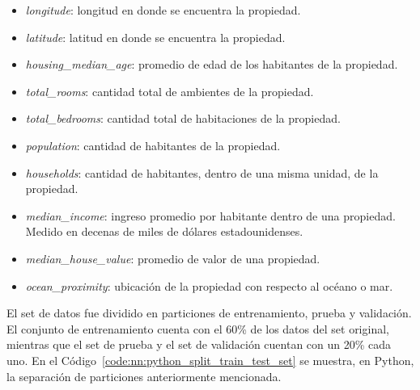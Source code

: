 \documentclass[11pt]{article}
\newcommand{\english}[1]{\textit{#1}}
\begin{document}
\begin{itemize}
    \item \english{longitude}: longitud en donde se encuentra la propiedad.
    \item \english{latitude}: latitud en donde se encuentra la propiedad.
    \item \english{housing\_median\_age}: promedio de edad de los habitantes de la propiedad.
    \item \english{total\_rooms}: cantidad total de ambientes de la propiedad.
    \item \english{total\_bedrooms}: cantidad total de habitaciones de la propiedad.
    \item \english{population}: cantidad de habitantes de la propiedad.
    \item \english{households}: cantidad de habitantes, dentro de una misma unidad, de la propiedad.
    \item \english{median\_income}: ingreso promedio por habitante dentro de una propiedad. Medido en decenas de miles de dólares estadounidenses.
    \item \english{median\_house\_value}: promedio de valor de una propiedad.
    \item \english{ocean\_proximity}: ubicación de la propiedad con respecto al océano o mar.
\end{itemize}

El set de datos fue dividido en particiones de entrenamiento, prueba y validación. El conjunto de entrenamiento cuenta con el 60\% de los datos del set original, mientras que el set de prueba y el set de validación cuentan con un 20\% cada uno. En el Código~\ref{code:nn:python_split_train_test_set} se muestra, en Python, la separación de particiones anteriormente mencionada.
\end{document}

